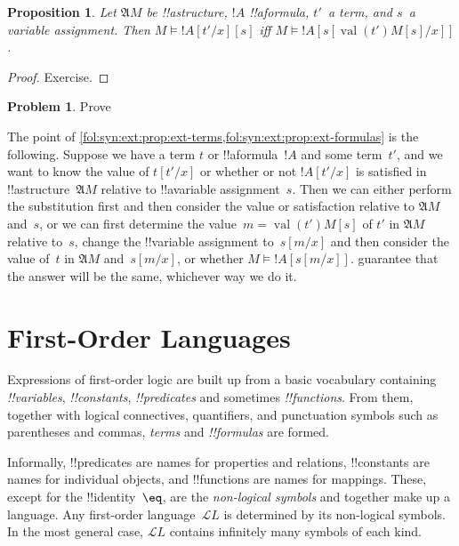 \documentclass[10pt,a4paper]{article}
\makeatletter
\theoremstyle{plain}
\newtheorem{prop}[thm]{Proposition}
\theoremstyle{definition}
\newtheorem{prob}{Problem}[section]
\theoremstyle{remark}
\newenvironment{explain}{}{}
\newcommand*{\olfileid}[3]{}
\newcommand*{\olsection}[1]{\section*{#1}}
\newcommand*{\ollabel}[1]{\label{#1}}
\newcommand{\olref}{\@ifnextchar[{\olref@i}{\olref@final}}
\def\olref@i[#1]{\@ifnextchar[{\olref@ii}{\olref@final}}
\def\olref@ii[#1]{\@ifnextchar[{\olref@iii}{\olref@final}}
\def\olref@iii[#1]{\olref@final}
\def\olref@final#1{\ref{#1}}
\providecommand{\Subst}[3]{#1[#2/#3]}
\providecommand{\Struct}{\ensuremath{\mathfrak{A}}}
\providecommand{\Sat}[2]{\ensuremath{#1 \models #2}}
\providecommand{\Lang}{\ensuremath{\mathcal{L}}}
\providecommand{\Value}[1]{\operatorname{val}(#1)}
\providecommand{\cref}[1]{\ref{#1}}
\makeatother
\begin{document}
\begin{prop}\ollabel{prop:ext-formulas} Let $\Struct M$ be
!!a{structure}, $!A$ !!a{formula}, $t'$~a term, and $s$~a variable
assignment. Then $\Sat{M}{\Subst{!A}{t'}{x}}[s]$ iff
$\Sat{M}{!A}[\Subst{s}{\Value{t'}{M}[s]}{x}]$.
\end{prop}

\begin{proof}
Exercise.
\end{proof}

\begin{prob}
Prove \olref[fol][syn][ext]{prop:ext-formulas}
\end{prob}

\begin{explain}
  The point of
  \cref{fol:syn:ext:prop:ext-terms,fol:syn:ext:prop:ext-formulas} is
  the following. Suppose we have a term $t$ or !!a{formula}~$!A$ and
  some term~$t'$, and we want to know the value of $\Subst{t}{t'}{x}$
  or whether or not $\Subst{!A}{t'}{x}$ is satisfied in
  !!a{structure}~$\Struct M$ relative to !!a{variable} assignment~$s$.
  Then we can either perform the substitution first and then consider
  the value or satisfaction relative to $\Struct{M}$ and~$s$, or we
  can first determine the value~$m = \Value{t'}{M}[s]$ of $t'$ in
  $\Struct{M}$ relative to~$s$, change the !!{variable} assignment
  to~$\Subst{s}{m}{x}$ and then consider the value of~$t$ in
  $\Struct{M}$ and~$\Subst{s}{m}{x}$, or whether
  $\Sat{M}{!A}[\Subst{s}{m}{x}]$.
  guarantee that the answer will be the same, whichever way we do it.
\end{explain}





\olfileid{fol}{syn}{fol}

\olsection{First-Order Languages}


Expressions of first-order logic are built up from a basic vocabulary
containing \emph{!!{variable}s}, \emph{!!{constant}s},
\emph{!!{predicate}s} and sometimes \emph{!!{function}s}.  From them,
together with logical connectives, quantifiers, and punctuation
symbols such as parentheses and commas, \emph{terms} and
\emph{!!{formula}s} are formed.

\begin{explain}
Informally, !!{predicate}s are names for properties and relations,
!!{constant}s are names for individual objects, and !!{function}s are
names for mappings.  These, except for the !!{identity}~$\eq$, are the
\emph{non-logical symbols} and together make up a language.  Any
first-order language~$\Lang L$ is determined by its non-logical
symbols.  In the most general case, $\Lang L$ contains infinitely many
symbols of each kind.
\end{explain}
\end{document}
